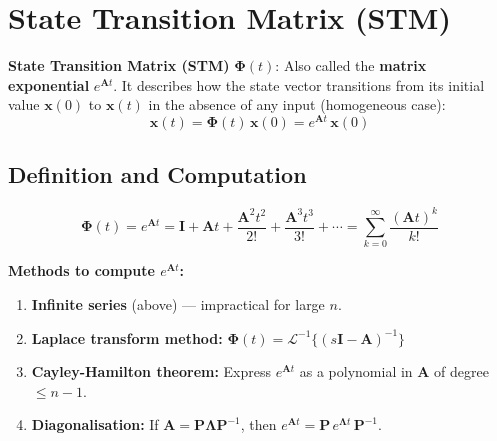 \documentclass[12pt,a4paper]{article}
\begin{document}
\section{State Transition Matrix (STM)}

\begin{tcolorbox}[defbox]
\textbf{State Transition Matrix (STM)} $\boldsymbol{\Phi}(t)$: Also called the \textbf{matrix exponential} $e^{\mathbf{A}t}$. It describes how the state vector transitions from its initial value $\mathbf{x}(0)$ to $\mathbf{x}(t)$ in the absence of any input (homogeneous case):
$$\mathbf{x}(t) = \boldsymbol{\Phi}(t)\,\mathbf{x}(0) = e^{\mathbf{A}t}\,\mathbf{x}(0)$$
\end{tcolorbox}

\subsection{Definition and Computation}

\begin{tcolorbox}[formulabox, title={Matrix Exponential --- Definition}]
$$\boldsymbol{\Phi}(t) = e^{\mathbf{A}t} = \mathbf{I} + \mathbf{A}t + \frac{\mathbf{A}^2 t^2}{2!} + \frac{\mathbf{A}^3 t^3}{3!} + \cdots = \sum_{k=0}^{\infty}\frac{(\mathbf{A}t)^k}{k!}$$
\end{tcolorbox}

\textbf{Methods to compute $e^{\mathbf{A}t}$:}

\begin{enumerate}[label=\textbf{\arabic*.}, leftmargin=*, itemsep=4pt]
  \item \textbf{Infinite series} (above) --- impractical for large $n$.
  \item \textbf{Laplace transform method:} $\boldsymbol{\Phi}(t) = \mathcal{L}^{-1}\{(s\mathbf{I}-\mathbf{A})^{-1}\}$
  \item \textbf{Cayley-Hamilton theorem:} Express $e^{\mathbf{A}t}$ as a polynomial in $\mathbf{A}$ of degree $\leq n-1$.
  \item \textbf{Diagonalisation:} If $\mathbf{A} = \mathbf{P}\mathbf{\Lambda}\mathbf{P}^{-1}$, then $e^{\mathbf{A}t} = \mathbf{P}\,e^{\mathbf{\Lambda}t}\,\mathbf{P}^{-1}$.
\end{enumerate}
\end{document}
